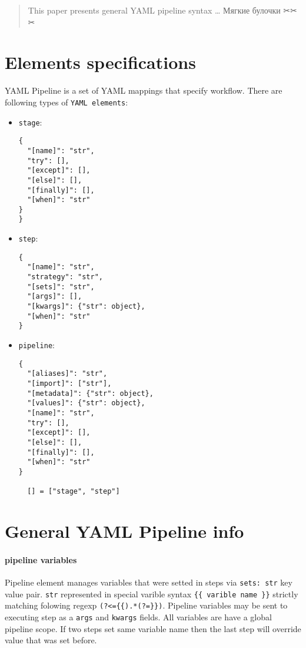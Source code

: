 \documentclass[14pt]{article}
\begin{document}
\maketitle
\begin{abstract}
This paper presents general YAML pipeline syntax \ldots
Мягкие булочки ✂✂✂
\end{abstract}
\begin{multicols}{2}
\section{Elements specifications}
YAML Pipeline is a set of YAML mappings that specify workflow.
There are following types of \verb|YAML elements|:
\begin{itemize}
  \item \verb|stage|:
    \begin{verbatim}
{
  "[name]": "str",
  "try": [],
  "[except]": [],
  "[else]": [],
  "[finally]": [],
  "[when]": "str"
}
}\end{verbatim}
  \item \verb|step|:
  \begin{verbatim}
{
  "[name]": "str",
  "strategy": "str",
  "[sets]": "str",
  "[args]": [],
  "[kwargs]": {"str": object},
  "[when]": "str"
}
  \end{verbatim}
  \item \verb|pipeline|:
  \begin{verbatim}
{
  "[aliases]": "str",
  "[import]": ["str"],
  "[metadata]": {"str": object},
  "[values]": {"str": object},
  "[name]": "str",  
  "try": [],
  "[except]": [],
  "[else]": [],
  "[finally]": [],
  "[when]": "str"
}
  
  [] = ["stage", "step"]
  \end{verbatim}
\end{itemize}

\section{General YAML Pipeline info}\label{general_info}
\paragraph{pipeline variables}Pipeline element manages variables that were setted in steps via \verb|sets: str| key value pair. \verb|str| represented in special varible syntax \texttt{\{\{ varible name \}\}} strictly matching folowing regexp \verb|(?<={{).*(?=}})|. Pipeline variables may be sent to executing step as a \verb|args| and \verb|kwargs| fields. All variables are have a global pipeline scope. If two steps set same variable name then the last step will override value that was set before.


\end{multicols}
\end{document}
